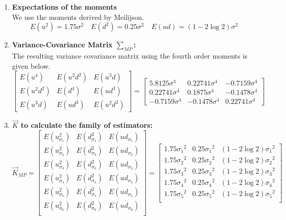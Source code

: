 \documentclass[12pt]{article}   	%
\begin{document}
\begin{enumerate}
\item \textbf{Expectations of the moments}\\
We use the moments derived by Meilijson.
$$ E(u^2 )=1.75\sigma^2\quad  E(d^2 )=0.25\sigma^2\quad  E(ud)=(1-2\log 2)\sigma{^2}  $$
\item \textbf{Variance-Covariance Matrix $\sum_{MP} $:}\\
The resulting variance covariance matrix using the fourth order moments is given below.
	$$  \begin{bmatrix}
			E(u^4 )&E(u^2 d^2 )&E(u^3 d)\\
			E(u^2 d^2 )&E(d^4 )&E({ud}^3 )\\
			E(u^3 d)&E({ud}^3 )&E(u^2 d^2 ) 
			\end{bmatrix}=
			\begin{bmatrix}
			5.8125\sigma^4&0.22741\sigma^4&-0.7159\sigma^4\\
			0.22741\sigma^4&0.1875\sigma^4&-0.1478\sigma^4\\
			-0.7159\sigma^4&-0.1478\sigma^4&0.22741\sigma^4 
			\end{bmatrix}
$$
\item\textbf{ $\vec{K}$ to calculate the family of estimators:}\\
$$\vec{K}_{MP}=
\begin{bmatrix}
E(u_{\sigma_1}^2)& E(d_{\sigma_1}^2)&E(ud_{\sigma_1})\\
E(u_{\sigma_2}^2)& E(d_{\sigma_2}^2)&E(ud_{\sigma_2})\\
E(u_{\sigma_3}^2)& E(d_{\sigma_3}^2)&E(ud_{\sigma_3})\\
E(u_{\sigma_4}^2)& E(d_{\sigma_4}^2)&E(ud_{\sigma_4})\\
E(u_{\sigma_5}^2)& E(d_{\sigma_5}^2)&E(ud_{\sigma_5})\\
E(u_{\sigma_6}^2)& E(d_{\sigma_6}^2)&E(ud_{\sigma_6})\\
\end{bmatrix}
=\begin{bmatrix}
1.75\sigma_1{^2} &0.25\sigma_1{^2} & (1-2\log 2)\sigma_1{^2} \\
1.75\sigma_2{^2} &0.25\sigma_2{^2} & (1-2\log 2)\sigma_2{^2} \\
1.75\sigma_3{^2} &0.25\sigma_3{^2} & (1-2\log 2)\sigma_3{^2} \\
1.75\sigma_4{^2} &0.25\sigma_4{^2} & (1-2\log 2)\sigma_4{^2} \\
1.75\sigma_5{^2} &0.25\sigma_5{^2} & (1-2\log 2)\sigma_5{^2} \\

\end{bmatrix}$$
\end{enumerate}
\end{document}
